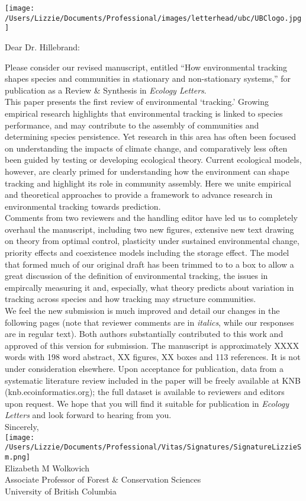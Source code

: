 \documentclass[11pt,a4paper]{letter}
\begin{document}
\begin{letter}{}
\texttt{[image: /Users/Lizzie/Documents/Professional/images/letterhead/ubc/UBClogo.jpg]}
\opening{Dear Dr. Hillebrand:}
Please consider our revised manuscript, entitled ``How environmental tracking shapes species and communities in stationary and non-stationary systems,'' for publication as a Review \& Synthesis in \emph{Ecology Letters}. 
\vspace{1.5ex}\\
This paper presents the first review of environmental `tracking.' Growing empirical research highlights that environmental tracking is linked to species performance, and may contribute to the assembly of communities and determining species persistence. Yet research in this area has often been focused on understanding the impacts of climate change, and comparatively less often been guided by testing or developing ecological theory. Current ecological models, however, are clearly primed for understanding how the environment can shape tracking and highlight its role in community assembly. Here we unite empirical and theoretical approaches to provide a framework to advance research in environmental tracking towards prediction. 
\vspace{1.5ex}\\
Comments from two reviewers and the handling editor have led us to completely overhaul the manuscript, including two new figures, extensive new text drawing on theory from optimal control, plasticity under sustained environmental change, priority effects and coexistence models including the storage effect. The model that formed much of our original draft has been trimmed to to a box to allow a great discussion of the definition of environmental tracking, the issues in empircally measuring it and, especially, what theory predicts about variation in tracking across species and how tracking may structure communities. 
\vspace{1.5ex}\\
We feel the new submission is much improved and detail our changes in the following pages (note that reviewer comments are in \emph{italics}, while our responses are in regular text). Both authors substantially contributed to this work and approved of this version for submission. The manuscript is approximately XXXX words with 198 word abstract, XX figures,  XX boxes and 113 references. It is not under consideration elsewhere. Upon acceptance for publication, data from a systematic literature review included in the paper will be freely available at KNB (knb.ecoinformatics.org); the full dataset is available to reviewers and editors upon request. We hope that you will find it suitable for publication in \emph{Ecology Letters} and look forward to hearing from you.
\vspace{1.5ex}\\
Sincerely,\\

\texttt{[image: /Users/Lizzie/Documents/Professional/Vitas/Signatures/SignatureLizzieSm.png]} \\

Elizabeth M Wolkovich\\
Associate Professor of Forest \& Conservation Sciences\\ 
University of British Columbia
\end{letter}
\end{document}

